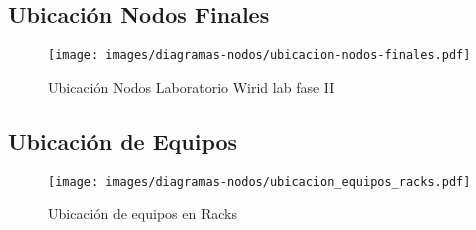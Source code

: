 
\subsection{Ubicación Nodos Finales}


\begin{figure}[H]
        \centering
         \caption{Ubicación Nodos Laboratorio Wirid lab fase II}
        \texttt{[image: images/diagramas-nodos/ubicacion-nodos-finales.pdf]}
        \label{fig:ubicacion_nodos}
\end{figure}



\subsection{Ubicación de Equipos}


\begin{figure}[H]
        \centering
         \caption{Ubicación de equipos en Racks}
        \texttt{[image: images/diagramas-nodos/ubicacion\_equipos\_racks.pdf]}
        \label{fig:equipos_racks}
\end{figure}
